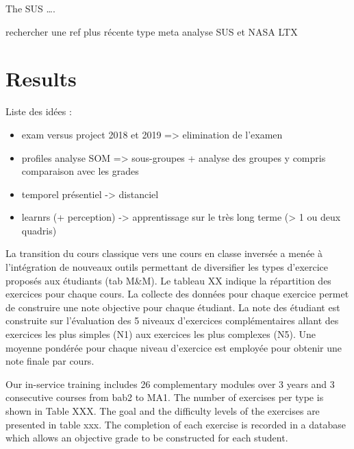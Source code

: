 \documentclass[
]{article}
\providecommand{\tightlist}{%
  \setlength{\itemsep}{0pt}\setlength{\parskip}{0pt}}
\begin{document}
The SUS \ldots.

rechercher une ref plus récente type meta analyse SUS et NASA LTX

\hypertarget{results}{%
\section{Results}\label{results}}

Liste des idées :

\begin{itemize}
\tightlist
\item
  exam versus project 2018 et 2019 =\textgreater{} elimination de
  l'examen
\item
  profiles analyse SOM =\textgreater{} sous-groupes + analyse des
  groupes y compris comparaison avec les grades
\item
  temporel présentiel -\textgreater{} distanciel
\item
  learnrs (+ perception) -\textgreater{} apprentissage sur le très long
  terme (\textgreater{} 1 ou deux quadris)
\end{itemize}

La transition du cours classique vers une cours en classe inversée a
menée à l'intégration de nouveaux outils permettant de diversifier les
types d'exercice proposés aux étudiants (tab M\&M). Le tableau XX
indique la répartition des exercices pour chaque cours. La collecte des
données pour chaque exercice permet de construire une note objective
pour chaque étudiant. La note des étudiant est construite sur
l'évaluation des 5 niveaux d'exercices complémentaires allant des
exercices les plus simples (N1) aux exercices les plus complexes (N5).
Une moyenne pondérée pour chaque niveau d'exercice est employée pour
obtenir une note finale par cours.

Our in-service training includes 26 complementary modules over 3 years
and 3 consecutive courses from bab2 to MA1. The number of exercises per
type is shown in Table XXX. The goal and the difficulty levels of the
exercises are presented in table xxx. The completion of each exercise is
recorded in a database which allows an objective grade to be constructed
for each student.
\end{document}
